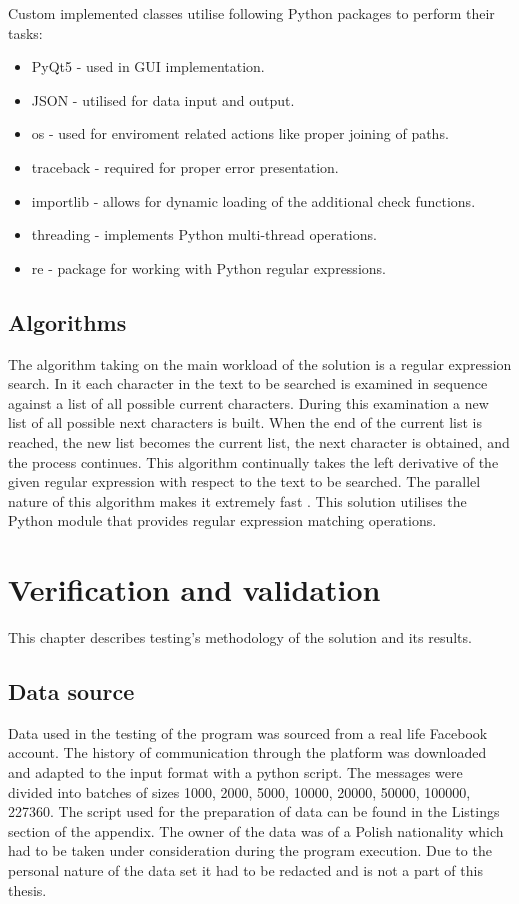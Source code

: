 \documentclass[a4paper,twoside,12pt]{book}
\begin{document}
Custom implemented classes utilise following Python packages to perform their tasks: 

\begin{itemize}
   \item PyQt5 - used in GUI implementation.
   \item JSON - utilised for data input and output.
   \item os - used for enviroment related actions like proper joining of paths.
   \item traceback - required for proper error presentation.
   \item importlib - allows for dynamic loading of the additional check functions.
   \item threading - implements Python multi-thread operations.
   \item re - package for working with Python regular expressions.
\end{itemize}

\section{Algorithms}

The algorithm taking on the main workload of the solution is a regular expression search. In it each character in the text to be searched is examined in sequence against a 
list of all possible current characters. During this examination a new list of all possible next characters is built. When the end of the current list is reached, the new list becomes the current list, the next 
character is obtained, and the process continues. This algorithm continually takes the left derivative of the given regular expression with respect to the text to be searched. The parallel nature of this algorithm 
makes it extremely fast \cite{bib:articleRE}. This solution utilises the Python module that provides regular expression matching operations.

\chapter{Verification and validation}

This chapter describes testing's methodology of the solution and its results.

\section{Data source}

Data used in the testing of the program was sourced from a real life Facebook account. The history of communication through the platform was downloaded and adapted to the input format with a python script.
The messages were divided into batches of sizes 1000, 2000, 5000, 10000, 20000, 50000, 100000, 227360. The script used for the preparation of data can be found in the Listings section of the appendix.
The owner of the data was of a Polish nationality which had to be taken under consideration during the program execution. Due to the personal nature of the data set it had to be 
redacted and is not a part of this thesis.
\end{document}
